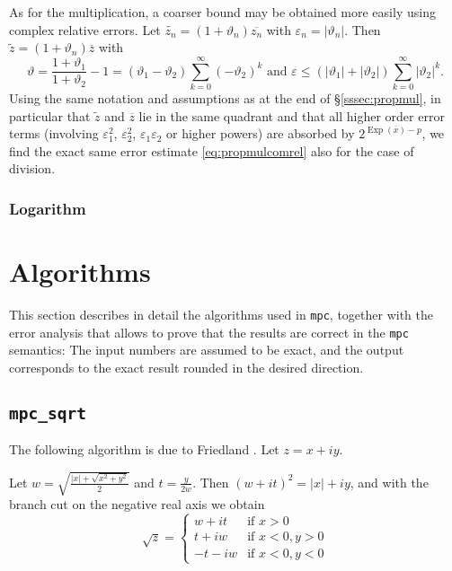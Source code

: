 \documentclass {article}
\newcommand {\corr}[1]{\widetilde {#1}}
\newcommand {\appro}[1]{\overline {#1}}
\newcommand {\mpc}{{\tt mpc}}
\DeclareMathOperator{\Exp}{\operatorname {Exp}}
\renewcommand {\epsilon}{\varepsilon}
\renewcommand {\theta}{\vartheta}
\renewcommand {\leq}{\leqslant}
\begin{document}
As for the multiplication, a coarser
bound may be obtained more easily using complex relative errors.
Let $\corr {z_n} = (1 + \theta_n) \appro {z_n}$ with
$\epsilon_n = | \theta_n |$. Then $\corr z = (1 + \theta_n) \appro z$
with
\[
\theta = \frac {1 + \theta_1}{1 + \theta_2} - 1
= (\theta_1 - \theta_2) \sum_{k = 0}^\infty (- \theta_2)^k
\text { and }
\epsilon \leq (|\theta_1| + |\theta_2|) \sum_{k = 0}^\infty |\theta_2|^k.
\]
Using the same notation and assumptions as at the end of
\S\ref {sssec:propmul}, in particular that $\corr z$ and $\appro z$
lie in the same quadrant and that all higher order error terms
(involving $\epsilon_1^2$, $\epsilon_2^2$, $\epsilon_1 \epsilon_2$
or higher powers) are absorbed by $2^{\Exp (\appro x) - p}$,
we find the exact same error estimate \eqref {eq:propmulcomrel}
also for the case of division.


\subsubsection {Logarithm}



\section {Algorithms}

This section describes in detail the algorithms used in \mpc, together with
the error analysis that allows to prove that the results are correct in the
{\mpc} semantics: The input numbers are assumed to be exact, and the output
corresponds to the exact result rounded in the desired direction.


\subsection {\texttt {mpc\_sqrt}}

The following algorithm is due to Friedland \cite{Friedland67,Smith98}.
Let $z = x + i y$.

Let $w = \sqrt { \frac {|x| + \sqrt {x^2 + y^2}}{2}}$ and
$t = \frac {y}{2w}$. Then $(w + it)^2 = |x| + iy$, and with the branch cut on the negative real axis we obtain
\[
\sqrt z = \left\{
\begin {array}{cl}
w + i t & \text {if } x > 0 \\
t + i w & \text {if } x < 0, y > 0 \\
-t - i w & \text {if } x < 0, y < 0
\end {array}
\right.
\]
\end{document}
